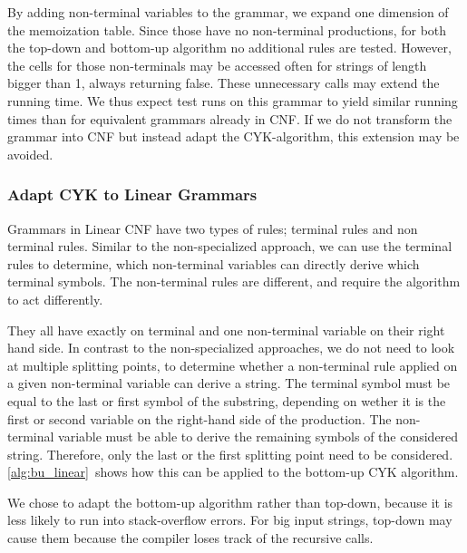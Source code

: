 By adding non-terminal variables to the grammar, we expand one dimension of the memoization table.
Since those have no non-terminal productions, for both the top-down and bottom-up algorithm no additional rules are tested.
However, the cells for those non-terminals may be accessed often for strings of length bigger than 1, always returning false.
These unnecessary calls may extend the running time.
We thus expect test runs on this grammar to yield similar running times than for equivalent grammars already in CNF.
If we do not transform the grammar into CNF but instead adapt the CYK-algorithm, this extension may be avoided.

\subsubsection{Adapt CYK to Linear Grammars}
Grammars in Linear CNF have two types of rules; terminal rules and non terminal rules.
Similar to the non-specialized approach, we can use the terminal rules to determine, which non-terminal variables can directly derive which terminal symbols.
The non-terminal rules are different, and require the algorithm to act differently.

They all have exactly on terminal and one non-terminal variable on their right hand side.
In contrast to the non-specialized approaches, we do not need to look at multiple splitting points, to determine whether a non-terminal rule applied on a given non-terminal variable can derive a string.
The terminal symbol must be equal to the last or first symbol of the substring, depending on wether it is the first or second variable on the right-hand side of the production.
The non-terminal variable must be able to derive the remaining symbols of the considered string.
Therefore, only the last or the first splitting point need to be considered.
\cref{alg:bu_linear}~shows how this can be applied to the bottom-up CYK algorithm.

We chose to adapt the bottom-up algorithm rather than top-down, because it is less likely to run into stack-overflow errors.
For big input strings, top-down may cause them because the compiler loses track of the recursive calls.

